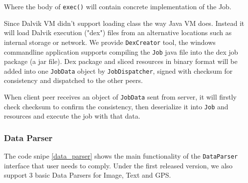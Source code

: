 \documentclass[conference]{IEEEtran}
\begin{document}
Where the body of \texttt{exec()} will contain concrete implementation of the Job.

Since Dalvik VM didn't support loading class the way Java VM does. Instead it will load Dalvik execution ("dex") files from an alternative locations such as internal storage or network. We provide \texttt{DexCreator} tool, the windows commandline application supports compiling the \texttt{Job} java file into the dex job package (a jar file). Dex package and sliced resources in binary format will be added into one \texttt{JobData} object by \texttt{JobDispatcher}, signed with checksum for consistency and dispatched to the other peers.

When client peer receives an object of \texttt{JobData} sent from server, it will firstly check checksum to confirm the consistency, then deserialize it into \texttt{Job} and resources and execute the job with that data.

\subsubsection{Data Parser}
The code snipe \ref{data_parser} shows the main functionality of the \texttt{DataParser} interface that user needs to comply. Under the first released version, we also support 3 basic Data Parsers for Image, Text and GPS.\\

\noindent {}	
\end{document}
